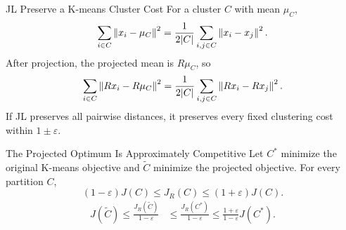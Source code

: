 \begin{frame}{JL Preserve a K-means Cluster Cost}
  For a cluster $C$ with mean $\mu_C$,
  \[
    \sum_{i\in C}\left\lVert x_i-\mu_C\right\rVert^2
    =\frac{1}{2|C|}\sum_{i,j\in C}\left\lVert x_i-x_j\right\rVert^2.
  \]
  \pause
  After projection, the projected mean is $R\mu_C$, so
  \[
    \sum_{i\in C}\left\lVert Rx_i-R\mu_C\right\rVert^2
    =\frac{1}{2|C|}\sum_{i,j\in C}\left\lVert Rx_i-Rx_j\right\rVert^2.
  \]
  \pause
  \centering
  If JL preserves all pairwise distances, it preserves every fixed clustering cost within $1\pm\varepsilon$.
\end{frame}

\begin{frame}{The Projected Optimum Is Approximately Competitive}
  Let $C^*$ minimize the original K-means objective and $\widetilde C$ minimize the projected objective. For every partition $C$,
  \[
    (1-\varepsilon)J(C)\le J_R(C)\le(1+\varepsilon)J(C).
  \]
  \pause
  \begin{align*}
    J(\widetilde C)
    \le \frac{J_R(\widetilde C)}{1-\varepsilon}&\le \frac{J_R(C^*)}{1-\varepsilon}\le \frac{1+\varepsilon}{1-\varepsilon}J(C^*).
  \end{align*}
\end{frame}

